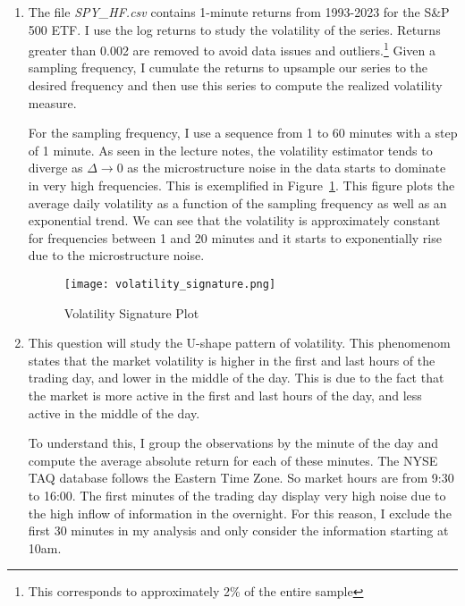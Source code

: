 \begin{solution}
\begin{enumerate}[label = \arabic*)]
    \item The file \textit{SPY\_HF.csv} contains 1-minute returns from 1993-2023 for the S\&P 500 ETF. I use the log returns to study the volatility of the series. Returns greater than 0.002 are removed to avoid data issues and outliers.\footnote{This corresponds to approximately 2\% of the entire sample} Given a sampling frequency, I cumulate the returns to upsample our series to the desired frequency and then use this series to compute the realized volatility measure. 

    For the sampling frequency, I use a sequence from 1 to 60 minutes with a step of 1 minute. As seen in the lecture notes, the volatility estimator tends to diverge as \(\Delta \to 0\) as the microstructure noise in the data starts to dominate in very high frequencies. This is exemplified in Figure~\ref{fig:volatility_signature}. This figure plots the average daily volatility as a function of the sampling frequency as well as an exponential trend. We can see that the volatility is approximately constant for frequencies between 1 and 20 minutes and it starts to exponentially rise due to the microstructure noise.

    \begin{figure}[!htbp]
        \centering
        \caption{Volatility Signature Plot}
        \label{fig:volatility_signature}
        \texttt{[image: volatility\_signature.png]}
    \end{figure}
    
    \item This question will study the U-shape pattern of volatility. This phenomenom states that the market volatility is higher in the first and last hours of the trading day, and lower in the middle of the day. This is due to the fact that the market is more active in the first and last hours of the day, and less active in the middle of the day. 

    To understand this, I group the observations by the minute of the day and compute the average absolute return for each of these minutes. The NYSE TAQ database follows the Eastern Time Zone. So market hours are from 9:30 to 16:00. The first minutes of the trading day display very high noise due to the high inflow of information in the overnight. For this reason, I exclude the first 30 minutes in my analysis and only consider the information starting at 10am. 
    

\end{enumerate}
\end{solution}

